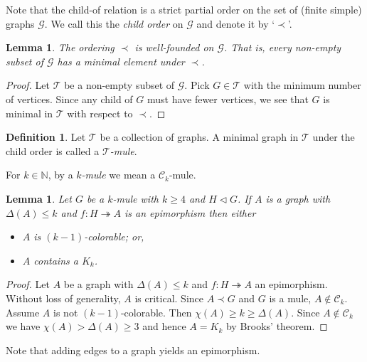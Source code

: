 \documentclass[12pt]{article}
\theoremstyle{plain}
\newtheorem{lem}[thm]{Lemma}
\theoremstyle{definition}
\newtheorem{defn}{Definition}[section]
\theoremstyle{remark}
\newcommand{\fancy}[1]{\mathcal{#1}}
\newcommand{\C}[1]{\fancy{C}_{#1}}
\newcommand{\IN}{\mathbb{N}}
\newcommand{\surj}{\twoheadrightarrow}
\begin{document}
Note that the child-of relation is a strict partial order on the set of (finite simple) graphs $\fancy{G}$.  We call this the \emph{child order} on $\fancy{G}$ and denote it by `$\prec$'.

\begin{lem}\label{well-founded}
The ordering $\prec$ is well-founded on $\fancy{G}$.  That is, every non-empty subset of $\fancy{G}$ has a minimal element under $\prec$.
\end{lem}
\begin{proof}
Let $\fancy{T}$ be a non-empty subset of $\fancy{G}$.  Pick $G \in \fancy{T}$ with the minimum number of vertices.  Since any child of $G$ must have fewer vertices, we see that $G$ is minimal in $\fancy{T}$ with respect to $\prec$.
\end{proof}

\begin{defn}
Let $\fancy{T}$ be a collection of graphs.  A minimal graph in $\fancy{T}$ under the child order is called a \emph{$\fancy{T}$-mule}.
\end{defn}

For $k \in \IN$, by a \emph{$k$-mule} we mean a $\C{k}$-mule.

\begin{lem}\label{EpiPower}
Let $G$ be a $k$-mule with $k \geq 4$ and $H \lhd G$.  If $A$ is a graph with $\Delta(A) \leq k$ and $f\colon H \surj A$ is an epimorphism then either
\begin{itemize}
\item $A$ is $(k-1)$-colorable; or,
\item $A$ contains a $K_k$.
\end{itemize}
\end{lem}
\begin{proof}
Let $A$ be a graph with $\Delta(A) \leq k$ and $f\colon H \surj A$ an epimorphism.  Without loss of generality, $A$ is critical.  Since $A \prec G$ and $G$ is a mule, $A \not \in \C{k}$.  Assume $A$ is not $(k-1)$-colorable.  Then $\chi(A) \geq k \geq \Delta(A)$.  Since $A \not \in \C{k}$ we have $\chi(A) > \Delta(A) \geq 3$ and hence $A = K_k$ by Brooks' theorem.
\end{proof}

Note that adding edges to a graph yields an epimorphism.
\end{document}
